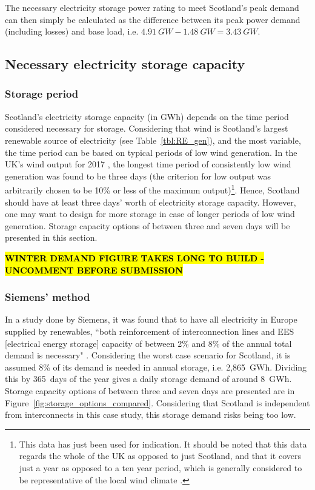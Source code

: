 The necessary electricity storage power rating to meet Scotland's peak demand can then simply be calculated as the difference between its peak power demand (including losses) and base load, i.e. $4.91~GW - 1.48~GW = 3.43~GW$.




\subsection{Necessary electricity storage capacity}

\subsubsection{Storage period}

Scotland's electricity storage capacity (in GWh) depends on the time period considered necessary for storage.
Considering that wind is Scotland's largest renewable source of electricity (see Table~\ref{tbl:RE_gen}), and the most variable, the time period can be based on typical periods of low wind generation.
In the UK's wind output for 2017 \citep{GridWatchnd}, the longest time period of consistently low wind generation was found to be three days (the criterion for low output was arbitrarily chosen to be 10\% or less of the maximum output)\footnote{This data has just been used for indication. It should be noted that this data regards the whole of the UK as opposed to just Scotland, and that it covers just a year as opposed to a ten year period, which is generally considered to be representative of the local wind climate \citep[p.~15]{Boehme2006}.}.
Hence, Scotland should have at least three days' worth of electricity storage capacity.
However, one may want to design for more storage in case of longer periods of low wind generation.
Storage capacity options of between three and seven days will be presented in this section.

\textbf{\hl{WINTER DEMAND FIGURE TAKES LONG TO BUILD - UNCOMMENT BEFORE SUBMISSION}}

%



\subsubsection{Siemens' method}

In a study done by Siemens, it was found that to have all electricity in Europe supplied by renewables, ``both reinforcement of interconnection lines and EES [electrical energy storage] capacity of between 2\% and 8\% of the annual total demand is necessary" \citep[p.~69]{IEC2011}.
Considering the worst case scenario for Scotland, it is assumed 8\% of its demand is needed in annual storage, i.e. 2,865~GWh.
Dividing this by 365~days of the year gives a daily storage demand of around 8~GWh.
Storage capacity options of between three and seven days are presented are in Figure~\ref{fig:storage_options_compared}.
Considering that Scotland is independent from interconnects in this case study, this storage demand risks being too low.



